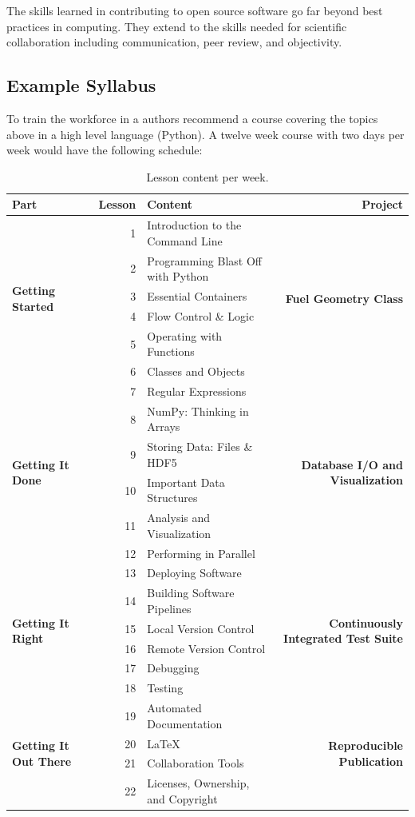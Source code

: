 \documentclass{anstrans}
\begin{document}
The skills learned in contributing to open source software go far beyond best
practices in computing. They extend to the skills needed for scientific
collaboration including communication, peer review, and objectivity.

\subsection{Example Syllabus}

To train the workforce in a authors recommend a course covering the topics
above in a high level language (Python). A twelve week course with two days per
week would have the following schedule:

\begin{table}[t]
\centering
\begin{tabular}{|l|r|l|r|}
\hline
\textbf{Part} & \textbf{Lesson} & \textbf{Content} & \textbf{Project} \\
\hline
\multirow{6}{*}{\textbf{Getting Started}}
& 1 & Introduction to the Command Line
& \multirow{6}{*}{\textbf{Fuel Geometry Class}}\\
& 2 & Programming Blast Off with Python & \\
& 3 & Essential Containers & \\
& 4 & Flow Control \& Logic & \\
& 5 & Operating with Functions & \\
& 6 & Classes and Objects & \\
\hline
\multirow{6}{*}{\textbf{Getting It Done}}
& 7 & Regular Expressions
& \multirow{6}{*}{\textbf{Database I/O and Visualization}}\\
& 8 & NumPy: Thinking in Arrays & \\
& 9 & Storing Data: Files \& HDF5 & \\
& 10 & Important Data Structures & \\
& 11 & Analysis and Visualization & \\
& 12 & Performing in Parallel & \\
\hline
\multirow{6}{*}{\textbf{Getting It Right}}
& 13 & Deploying Software
& \multirow{6}{*}{\textbf{Continuously Integrated Test Suite}}\\
& 14 & Building Software Pipelines & \\
& 15 & Local Version Control & \\
& 16 & Remote Version Control & \\
& 17 & Debugging & \\
& 18 & Testing & \\
\hline
\multirow{4}{*}{\textbf{Getting It Out There}}
& 19 & Automated Documentation
& \multirow{4}{*}{\textbf{Reproducible Publication}}\\
& 20 & LaTeX & \\
& 21 & Collaboration Tools& \\
& 22 & Licenses, Ownership, and Copyright & \\
\hline
\end{tabular}
\caption{Lesson content per week.}
\label{tab:syllabus}
\end{table}
\end{document}
